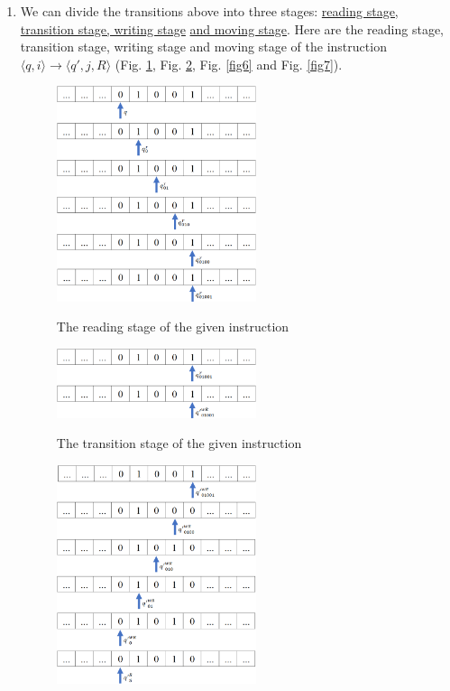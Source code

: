 \documentclass[12pt,a4paper]{article}
\makeatletter
\newtheorem*{solution}{Solution}
\theoremstyle{definition}
\renewenvironment{solution}[1][Solution] {\par\pushQED{\qed}\normalfont\topsep6\p@\@plus6\p@\relax\trivlist\item[\hskip\labelsep\bfseries#1\@addpunct{.}]\ignorespaces}{\popQED\endtrivlist\@endpefalse} \makeatother
\makeatother
\begin{document}
\begin{enumerate}
\begin{solution}
We can divide the transitions above into three stages: \underline{reading stage, transition stage, writing stage} \underline{and moving stage}. Here are the reading stage, transition stage, writing stage and moving stage of the instruction $\langle q, i \rangle \rightarrow \langle q',j, R\rangle$ (Fig. \ref{fig4}, Fig. \ref{fig5}, Fig. \ref{fig6} and Fig. \ref{fig7}).
\begin{figure}[htbp]
  \centering
  \includegraphics[width=2.3in]{reading-stage.png}\\
  \caption{The reading stage of the given instruction}\label{fig4}
\end{figure}
\clearpage
\begin{figure}[htbp]
  \centering
  \includegraphics[width=2.3in]{transition-stage.png}\\
  \caption{The transition stage of the given instruction}\label{fig5}
\end{figure}
\begin{figure}[htbp]
  \centering
  \includegraphics[width=2.3in]{writing-stage.png}\\

\end{figure}
\end{solution}
\end{enumerate}
\end{document}
